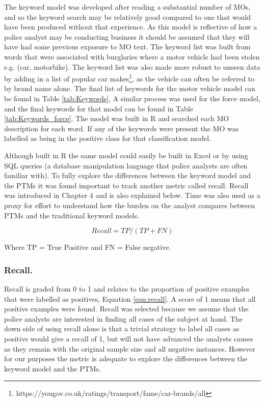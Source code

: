 The keyword model was developed after reading a substantial number of MOs, and so the keyword search may be relatively good compared to one that would have been produced without that experience. As this model is reflective of how a police analyst may be conducting business it should be assumed that they will have had some previous exposure to MO text. The keyword list was built from words that were associated with burglaries where a motor vehicle had been stolen e.g. (car, motorbike). The keyword list was also made more robust to unseen data by adding in a list of popular car makes\footnote{https://yougov.co.uk/ratings/transport/fame/car-brands/all}, as the vehicle can often be referred to by brand name alone. The final list of keywords for the motor vehicle model can be found in Table \ref{tab:Keywords}, A similar process was used for the force model, and the final keywords for that model can be found in Table \ref{tab:Keywords_force}. The model was built in R and searched each MO description for each word. If any of the keywords were present the MO was labelled as being in the positive class for that classification model.

Although built in R the same model could easily be built in Excel or by using SQL queries (a database manipulation language that police analysts are often familiar with). To fully explore the differences between the keyword model and the PTMs it was found important to track another metric called recall. Recall was introduced in Chapter 4 and is also explained below. Time was also used as a proxy for effort to understand how the burden on the analyst compares between PTMs and the traditional keyword models.

\begin{equation}
 Recall = TP / (TP + FN)
 \label{eqn:recall}
\end{equation}

Where TP = True Positive and FN = False negative.
\subsubsection{Recall.} Recall is graded from 0 to 1 and relates to the proportion of positive examples that were labelled as positives, Equation \ref{eqn:recall}. A score of 1 means that all positive examples were found. Recall was selected because we assume that the police analysts are interested in finding all cases of the subject at hand. The down side of using recall alone is that a trivial strategy to label all cases as positive would give a recall of 1, but will not have advanced the analysts causes as they remain with the original sample size and all negative instances. However for our purposes the metric is adequate to explore the differences between the keyword model and the PTMs.


